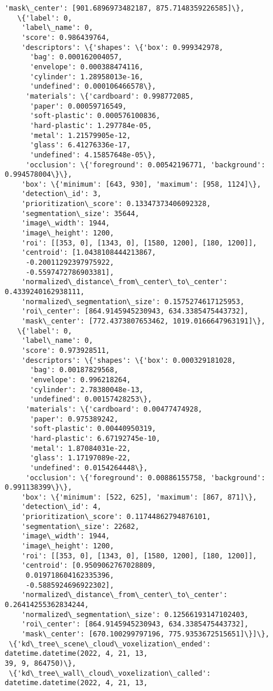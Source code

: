 \documentclass[11pt]{article}
\begin{document}
\begin{tcolorbox}[breakable, size=fbox, boxrule=.5pt, pad at break*=1mm, opacityfill=0]
\begin{Verbatim}[commandchars=\\\{\}]
    'mask\_center': [901.6896973482187, 875.7148359226585]\},
   \{'label': 0,
    'label\_name': 0,
    'score': 0.986439764,
    'descriptors': \{'shapes': \{'box': 0.999342978,
      'bag': 0.000162004057,
      'envelope': 0.000388474116,
      'cylinder': 1.28958013e-16,
      'undefined': 0.000106466578\},
     'materials': \{'cardboard': 0.998772085,
      'paper': 0.00059716549,
      'soft-plastic': 0.000576100836,
      'hard-plastic': 1.297784e-05,
      'metal': 1.21579905e-12,
      'glass': 6.41276336e-17,
      'undefined': 4.15857648e-05\},
     'occlusion': \{'foreground': 0.00542196771, 'background': 0.994578004\}\},
    'box': \{'minimum': [643, 930], 'maximum': [958, 1124]\},
    'detection\_id': 3,
    'prioritization\_score': 0.13347373406092328,
    'segmentation\_size': 35644,
    'image\_width': 1944,
    'image\_height': 1200,
    'roi': [[353, 0], [1343, 0], [1580, 1200], [180, 1200]],
    'centroid': [1.0438108444213867,
     -0.20011292397975922,
     -0.5597472786903381],
    'normalized\_distance\_from\_center\_to\_center': 0.4339240162938111,
    'normalized\_segmentation\_size': 0.1575274617125953,
    'roi\_center': [864.9145945230943, 634.3385475443732],
    'mask\_center': [772.4373807653462, 1019.0166647963191]\},
   \{'label': 0,
    'label\_name': 0,
    'score': 0.973928511,
    'descriptors': \{'shapes': \{'box': 0.000329181028,
      'bag': 0.00187829568,
      'envelope': 0.996218264,
      'cylinder': 2.78380048e-13,
      'undefined': 0.00157428253\},
     'materials': \{'cardboard': 0.00477474928,
      'paper': 0.975389242,
      'soft-plastic': 0.00440950319,
      'hard-plastic': 6.67192745e-10,
      'metal': 1.87084031e-22,
      'glass': 1.17197089e-22,
      'undefined': 0.0154264448\},
     'occlusion': \{'foreground': 0.00886155758, 'background': 0.991138399\}\},
    'box': \{'minimum': [522, 625], 'maximum': [867, 871]\},
    'detection\_id': 4,
    'prioritization\_score': 0.11744862794876101,
    'segmentation\_size': 22682,
    'image\_width': 1944,
    'image\_height': 1200,
    'roi': [[353, 0], [1343, 0], [1580, 1200], [180, 1200]],
    'centroid': [0.9509062767028809,
     0.019718604162335396,
     -0.5885924696922302],
    'normalized\_distance\_from\_center\_to\_center': 0.26414255362834244,
    'normalized\_segmentation\_size': 0.12566193147102403,
    'roi\_center': [864.9145945230943, 634.3385475443732],
    'mask\_center': [670.100299797196, 775.9353672515651]\}]\},
 \{'kd\_tree\_scene\_cloud\_voxelization\_ended': datetime.datetime(2022, 4, 21, 13,
39, 9, 864750)\},
 \{'kd\_tree\_wall\_cloud\_voxelization\_called': datetime.datetime(2022, 4, 21, 13,

\end{Verbatim}
\end{tcolorbox}
\end{document}

